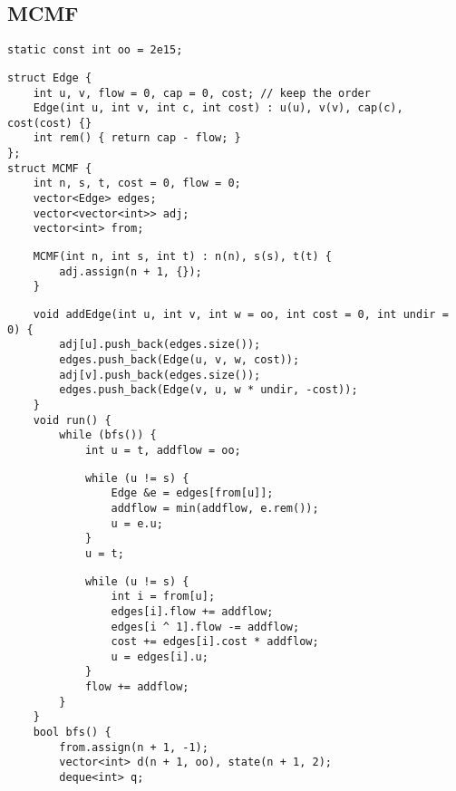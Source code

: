 \documentclass[twoside]{article}
\begin{document}
\begin{multicols*}{2}
{\subsection*{MCMF}
}
\begin{verbatim}
static const int oo = 2e15;
\end{verbatim}
\vspace{-12pt}
\begin{verbatim}
struct Edge {
    int u, v, flow = 0, cap = 0, cost; // keep the order
    Edge(int u, int v, int c, int cost) : u(u), v(v), cap(c), cost(cost) {}
    int rem() { return cap - flow; }
};
struct MCMF {
    int n, s, t, cost = 0, flow = 0;
    vector<Edge> edges;
    vector<vector<int>> adj;
    vector<int> from;
\end{verbatim}
\vspace{-12pt}
\begin{verbatim}
    MCMF(int n, int s, int t) : n(n), s(s), t(t) {
        adj.assign(n + 1, {});
    }
\end{verbatim}
\vspace{-12pt}
\begin{verbatim}
    void addEdge(int u, int v, int w = oo, int cost = 0, int undir = 0) {
        adj[u].push_back(edges.size());
        edges.push_back(Edge(u, v, w, cost));
        adj[v].push_back(edges.size());
        edges.push_back(Edge(v, u, w * undir, -cost));
    }
    void run() {
        while (bfs()) {
            int u = t, addflow = oo;
\end{verbatim}
\vspace{-12pt}
\begin{verbatim}
            while (u != s) {
                Edge &e = edges[from[u]];
                addflow = min(addflow, e.rem());
                u = e.u;
            }
            u = t;
\end{verbatim}
\vspace{-12pt}
\begin{verbatim}
            while (u != s) {
                int i = from[u];
                edges[i].flow += addflow;
                edges[i ^ 1].flow -= addflow;
                cost += edges[i].cost * addflow;
                u = edges[i].u;
            }
            flow += addflow;
        }
    }
    bool bfs() {
        from.assign(n + 1, -1);
        vector<int> d(n + 1, oo), state(n + 1, 2);
        deque<int> q;

\end{verbatim}
\end{multicols*}
\end{document}
